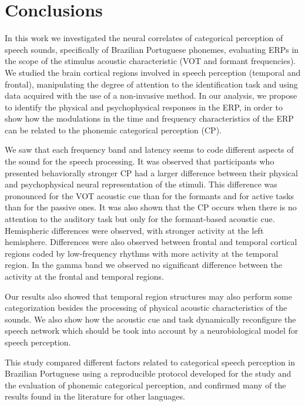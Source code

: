 
\section*{Conclusions}
\label{sec:concl}
In this work we investigated the neural correlates of categorical perception of
speech sounds, specifically of Brazilian Portuguese phonemes, evaluating ERPs
in the scope of the stimulus acoustic characteristic (VOT and formant
frequencies). We studied the brain cortical regions involved in speech
perception (temporal and frontal), manipulating the degree of attention to the
identification task and using data acquired with the use of a non-invasive
method. In our analysis, we propose to identify the physical and psychophysical
responses in the ERP, in order to show how the modulations in the time and
frequency characteristics of the ERP can be related to the phonemic categorical
perception (CP).

We saw that each frequency band and latency seems to code different aspects of
the sound for the speech processing. It was observed that participants who
presented behaviorally stronger CP had a larger difference between their
physical and psychophysical neural representation of the stimuli. This
difference was pronounced for the VOT acoustic cue than for the formants and
for active tasks than for the passive ones. It was also shown that the CP
occurs when there is no attention to the auditory task but only for the
formant-based acoustic cue. Hemispheric differences were observed, with
stronger activity at the left hemisphere. Differences were also observed
between frontal and temporal cortical regions coded by low-frequency rhythms
with more activity at the temporal region. In the gamma band we observed no
significant difference between the activity at the frontal and temporal
regions.

Our results also showed that temporal region structures may also perform some
categorization besides the processing of physical acoustic characteristics of
the sounds. We also show how the acoustic cue and task dynamically reconfigure
the speech network which should be took into account by a neurobiological model
for speech perception.

This study compared different factors related to categorical speech perception
in Brazilian Portuguese using a reproducible protocol developed for the study
and the evaluation of phonemic categorical perception, and confirmed many of
the results found in the literature for other languages.

